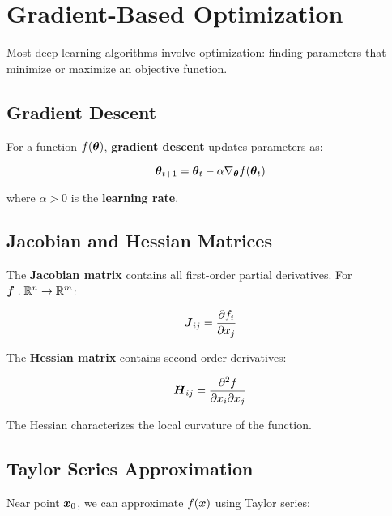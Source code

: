 
\section{Gradient-Based Optimization}
\label{sec:gradient-optimization}

Most deep learning algorithms involve optimization: finding parameters that minimize or maximize an objective function.

\subsection{Gradient Descent}

For a function $f(\boldsymbol{\theta})$, \textbf{gradient descent} updates parameters as:

\begin{equation}
\boldsymbol{\theta}_{t+1} = \boldsymbol{\theta}_t - \alpha \nabla_{\boldsymbol{\theta}} f(\boldsymbol{\theta}_t)
\end{equation}

where $\alpha > 0$ is the \textbf{learning rate}.

\subsection{Jacobian and Hessian Matrices}

The \textbf{Jacobian matrix} contains all first-order partial derivatives. For $\boldsymbol{f}: \mathbb{R}^n \to \mathbb{R}^m$:

\begin{equation}
\boldsymbol{J}_{ij} = \frac{\partial f_i}{\partial x_j}
\end{equation}

The \textbf{Hessian matrix} contains second-order derivatives:

\begin{equation}
\boldsymbol{H}_{ij} = \frac{\partial^2 f}{\partial x_i \partial x_j}
\end{equation}

The Hessian characterizes the local curvature of the function.

\subsection{Taylor Series Approximation}

Near point $\boldsymbol{x}_0$, we can approximate $f(\boldsymbol{x})$ using Taylor series:

